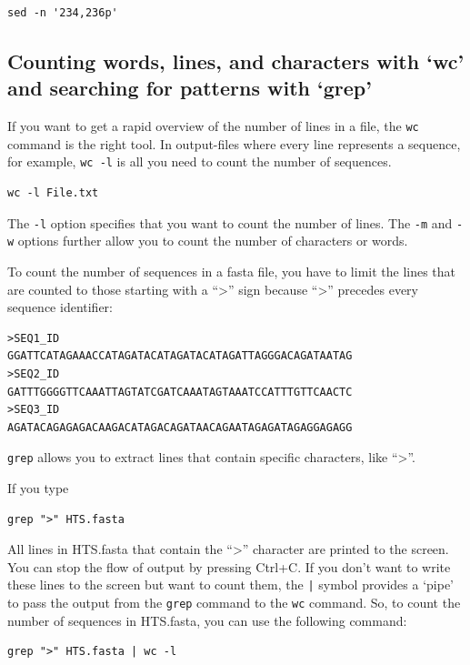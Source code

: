 \documentclass[11pt]{article}
\begin{document}
\begin{verbatim}
sed -n '234,236p'
\end{verbatim}
\subsection{Counting words, lines, and characters with `wc' and searching for patterns with `grep'}
\label{sec-4-2}

If you want to get a rapid overview of the number of lines in a file,
the \texttt{wc} command is the right tool. In output-files where
every line represents a sequence, for example, \texttt{wc -l} is all you need to count the
number of sequences.


\begin{verbatim}
wc -l File.txt
\end{verbatim}

The \texttt{-l} option specifies that you want to count the number of
lines. The \texttt{-m} and \texttt{-w} options further allow you to count the number
of characters or words.


To count the number of sequences in a fasta file, you have to limit
the lines that are counted to those starting with a ``>'' sign
because ``>'' precedes every sequence identifier:


\begin{verbatim}
>SEQ1_ID
GGATTCATAGAAACCATAGATACATAGATACATAGATTAGGGACAGATAATAG
>SEQ2_ID
GATTTGGGGTTCAAATTAGTATCGATCAAATAGTAAATCCATTTGTTCAACTC
>SEQ3_ID
AGATACAGAGAGACAAGACATAGACAGATAACAGAATAGAGATAGAGGAGAGG
\end{verbatim}

\texttt{grep} allows you to extract lines that contain specific
characters, like ``>''. 


If you type


\begin{verbatim}
grep ">" HTS.fasta
\end{verbatim}

All lines in HTS.fasta that contain the ``>'' character are printed to
the screen. You can stop the flow of output by pressing Ctrl+C. If you
don't want to write these lines to the screen but want to count them,
the \texttt{|} symbol provides a `pipe' to pass the output from the \texttt{grep}
command to the \texttt{wc} command. So, to count the number of
sequences in HTS.fasta, you can use the following command:


\begin{verbatim}
grep ">" HTS.fasta | wc -l
\end{verbatim}
\end{document}
